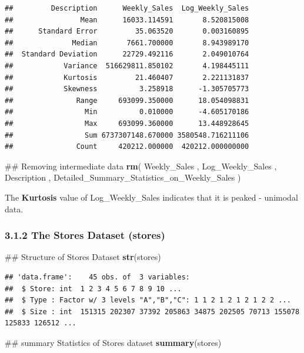 \documentclass[]{article}
\newenvironment{Shaded}{\begin{snugshade}}{\end{snugshade}}
\newcommand{\KeywordTok}[1]{\textcolor[rgb]{0.13,0.29,0.53}{\textbf{{#1}}}}
\newcommand{\NormalTok}[1]{{#1}}
\begin{document}
\begin{verbatim}
##         Description      Weekly_Sales  Log_Weekly_Sales
##                Mean      16033.114591       8.520815008
##      Standard Error         35.063520       0.003160895
##              Median       7661.700000       8.943989170
##  Standard Deviation      22729.492116       2.049010764
##            Variance  516629811.850102       4.198445111
##            Kurtosis         21.460407       2.221131837
##            Skewness          3.258918      -1.305705773
##               Range     693099.350000      18.054098831
##                 Min          0.010000      -4.605170186
##                 Max     693099.360000      13.448928645
##                 Sum 6737307148.670000 3580548.716211106
##               Count     420212.000000  420212.000000000
\end{verbatim}

\begin{Shaded}
\begin{Highlighting}[]
\NormalTok{## Removing intermediate data}
\KeywordTok{rm}\NormalTok{( }
  \NormalTok{Weekly_Sales ,  }
  \NormalTok{Log_Weekly_Sales , }
  \NormalTok{Description , }
  \NormalTok{Detailed_Summary_Statistics_on_Weekly_Sales )}
\end{Highlighting}
\end{Shaded}

The \textbf{Kurtosis} value of Log\_Weekly\_Sales indicates that it is
peaked - unimodal data.

\subsubsection{3.1.2 The Stores Dataset
(stores)}\label{the-stores-dataset-stores}

\begin{Shaded}
\begin{Highlighting}[]
\NormalTok{## Structure of Stores Dataset}
\KeywordTok{str}\NormalTok{(stores)}
\end{Highlighting}
\end{Shaded}

\begin{verbatim}
## 'data.frame':    45 obs. of  3 variables:
##  $ Store: int  1 2 3 4 5 6 7 8 9 10 ...
##  $ Type : Factor w/ 3 levels "A","B","C": 1 1 2 1 2 1 2 1 2 2 ...
##  $ Size : int  151315 202307 37392 205863 34875 202505 70713 155078 125833 126512 ...
\end{verbatim}

\begin{Shaded}
\begin{Highlighting}[]
\NormalTok{## summary Statistics of Stores dataset}
\KeywordTok{summary}\NormalTok{(stores)}
\end{Highlighting}
\end{Shaded}
\end{document}
